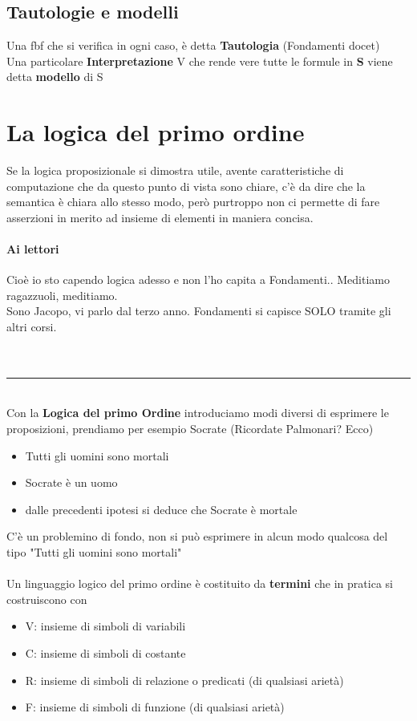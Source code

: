 \documentclass[12pt, a4paper, openany, oneside]{book}
\begin{document}
\subsection{Tautologie e modelli}
Una fbf che si verifica in ogni caso, è detta \textbf{Tautologia} (Fondamenti
docet)\\
Una particolare \textbf{Interpretazione} V che rende vere tutte le formule in
\textbf{S} viene detta \textbf{modello} di S
\section{La logica del primo ordine}
Se la logica proposizionale si dimostra utile, avente caratteristiche di 
computazione che da questo punto di vista sono chiare, c'è da dire che la 
semantica è chiara allo stesso modo, però purtroppo non ci permette di 
fare asserzioni in merito ad insieme di elementi in maniera concisa.
\paragraph{Ai lettori} Cioè io sto capendo logica adesso e non l'ho capita a 
Fondamenti.. Meditiamo ragazzuoli, meditiamo. \\
Sono Jacopo, vi parlo dal terzo anno. Fondamenti si capisce SOLO tramite gli 
altri corsi. \\ \\
\\
{\color{black} \rule{\linewidth}{0.2mm} }
\\
Con la \textbf{Logica del primo Ordine} introduciamo modi diversi di esprimere
le proposizioni, prendiamo per esempio Socrate (Ricordate Palmonari? Ecco)\\
\begin{itemize}
	\item Tutti gli uomini sono mortali
	\item Socrate è un uomo
	\item dalle precedenti ipotesi si deduce che Socrate è mortale
\end{itemize}
C'è un problemino di fondo, non si può esprimere in alcun modo qualcosa del tipo
"Tutti gli uomini sono mortali" \\ \\
Un linguaggio logico del primo ordine è costituito da \textbf{termini} che in 
pratica si costruiscono con 	
\begin{itemize}
	\item V: insieme di simboli di variabili
	\item C: insieme di simboli di costante
	\item R: insieme di simboli di relazione o predicati (di qualsiasi arietà)
	\item F: insieme di simboli di funzione (di qualsiasi arietà)
\end{itemize}
\end{document}
